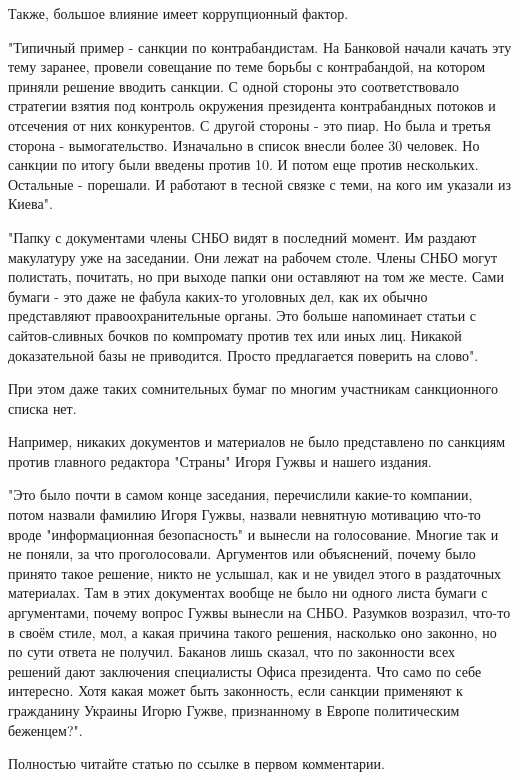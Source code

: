 Также, большое влияние имеет коррупционный фактор.

"Типичный пример - санкции по контрабандистам. На Банковой начали качать эту
тему заранее, провели совещание по теме борьбы с контрабандой, на котором
приняли решение вводить санкции. С одной стороны это соответствовало стратегии
взятия под контроль окружения президента контрабандных потоков и отсечения от
них конкурентов. С другой стороны - это пиар. Но была и третья сторона -
вымогательство. Изначально в список внесли более 30 человек. Но санкции по
итогу были введены против 10. И потом еще против нескольких. Остальные -
порешали. И работают в тесной связке с теми, на кого им указали из Киева".

"Папку с документами члены СНБО видят в последний момент. Им раздают макулатуру
уже на заседании. Они лежат на рабочем столе. Члены СНБО могут полистать,
почитать, но при выходе папки они оставляют на том же месте. Сами бумаги - это
даже не фабула каких-то уголовных дел, как их обычно представляют
правоохранительные органы. Это больше напоминает статьи с сайтов-сливных бочков
по компромату против тех или иных лиц. Никакой доказательной базы не
приводится. Просто предлагается поверить на слово". 

При этом даже таких сомнительных бумаг по многим участникам санкционного списка
нет.

Например, никаких документов и материалов не было представлено по санкциям
против главного редактора "Страны" Игоря Гужвы и нашего издания.

"Это было почти в самом конце заседания, перечислили какие-то компании, потом
назвали фамилию Игоря Гужвы, назвали невнятную мотивацию что-то вроде
"информационная безопасность" и вынесли на голосование. Многие так и не поняли,
за что проголосовали. Аргументов или объяснений, почему было принято такое
решение, никто не услышал, как и не увидел этого в раздаточных материалах. Там
в этих документах вообще не было ни одного листа бумаги с аргументами, почему
вопрос Гужвы вынесли на СНБО. Разумков возразил, что-то в своём стиле, мол, а
какая причина такого решения, насколько оно законно, но по сути ответа не
получил. Баканов лишь сказал, что по законности всех решений дают заключения
специалисты Офиса президента. Что само по себе интересно. Хотя какая может быть
законность, если санкции применяют к гражданину Украины Игорю Гужве,
признанному в Европе политическим беженцем?".

Полностью читайте статью по ссылке в первом комментарии.
